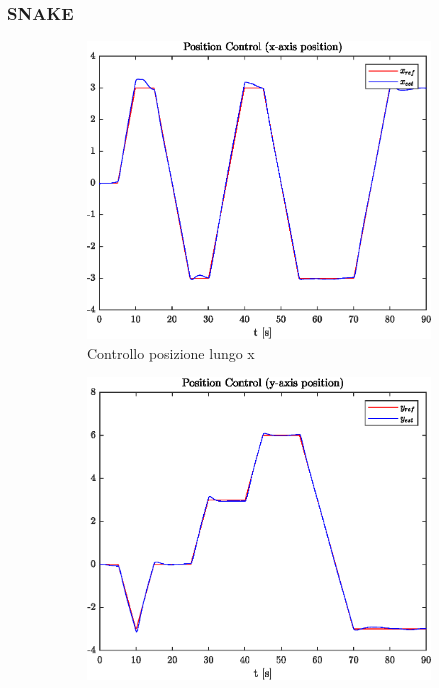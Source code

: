 \clearpage
\subsubsection{SNAKE}
\begin{figure}
	\centering
	\begin{subfigure}{0.45\textwidth}
		\centering
		\includegraphics[width=1\textwidth]{Simulazioni/Figure/PID/SNAKE/PositionControlXPos}
		\caption{Controllo posizione lungo x}
	\end{subfigure}
	\hfill
	\begin{subfigure}{0.45\textwidth}
		\centering
		\includegraphics[width=1\textwidth]{Simulazioni/Figure/PID/SNAKE/PositionControlYPos}

\end{subfigure}
\end{figure}
